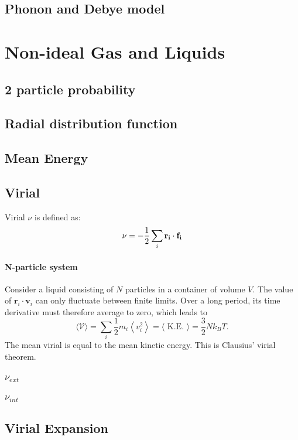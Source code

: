 \documentclass[12pt,a4paper]{article}
\begin{document}
\subsection{Phonon and Debye model}
\section{Non-ideal Gas and Liquids}
\subsection{2 particle probability}
\subsection{Radial distribution function}

\subsection{Mean Energy}
\subsection{Virial}
Virial $\nu$ is defined as: 
\begin{align*}
    \nu = -\dfrac{1}{2} \sum_i {\vb{r_i}\cdot \vb{f_i}}
\end{align*}
\paragraph*{N-particle system}
Consider a liquid consisting of $N$ particles in a container of volume $V$. The value of $\mathbf{r}_i \cdot \mathbf{v}_i$ can only fluctuate between finite limits. Over a long period, its time derivative must therefore average to zero, which leads to
$$
\langle\mathcal{V}\rangle=\sum_i \frac{1}{2} m_i\left\langle v_i^2\right\rangle=\langle\text { K.E. }\rangle=\frac{3}{2} N k_B T .
$$
The mean virial is equal to the mean kinetic energy. This is Clausius' virial theorem.
\subsubsection{${\nu_{ext}}$}
\subsubsection{${\nu_{int}}$}
\subsection{Virial Expansion}
\end{document}
